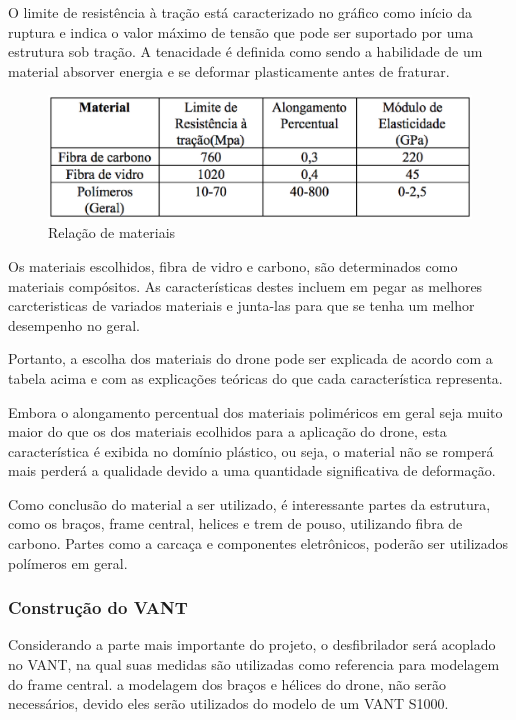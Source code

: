 O limite de resistência à tração está caracterizado no gráfico como início da ruptura e indica o valor máximo de tensão que pode ser suportado por uma estrutura sob tração.
A tenacidade é definida como sendo a habilidade de um material absorver energia e se deformar plasticamente antes de fraturar.

\begin{figure}[h]
    \centering
      \includegraphics[keepaspectratio=true,scale=0.5]{figuras/graficoRelacao.eps}
    \caption{ Relação de materiais}
    \label{fig:graficoRelacao}
\end{figure}

Os materiais escolhidos, fibra de vidro e carbono, são determinados como materiais compósitos. As características destes incluem em pegar as melhores carcteristicas de variados materiais e junta-las para que se tenha um melhor desempenho no geral. 

Portanto, a escolha dos materiais do drone pode ser explicada de acordo com a tabela acima e com as explicações teóricas do que cada característica representa. 

Embora o alongamento percentual dos materiais poliméricos em geral seja muito maior do que os dos materiais ecolhidos para a aplicação do drone, esta característica é exibida no domínio plástico, ou seja, o material não se romperá mais perderá a qualidade devido a uma quantidade significativa de deformação.

Como conclusão do material a ser utilizado, é interessante partes da estrutura, como os braços, frame central, helices e trem de pouso, utilizando fibra de carbono. Partes como a carcaça e componentes eletrônicos, poderão ser utilizados polímeros em geral. 

\subsubsection{Construção do VANT}

Considerando a parte mais importante do projeto, o desfibrilador será acoplado no VANT, na qual suas medidas são utilizadas como referencia para modelagem do frame central. a modelagem dos  braços e hélices do drone, não serão necessários, devido eles serão utilizados do modelo de um VANT S1000.

